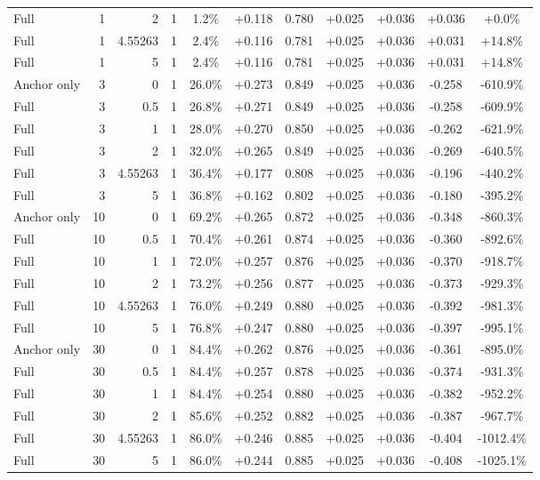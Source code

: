 \begin{table}[htbp]
\begin{tabular}{lrrrccccccc}
Full & 1 & 2 & 1 & 1.2\% & +0.118 & 0.780 & +0.025 & +0.036 & +0.036 & +0.0\% \\
Full & 1 & 4.55263 & 1 & 2.4\% & +0.116 & 0.781 & +0.025 & +0.036 & +0.031 & +14.8\% \\
Full & 1 & 5 & 1 & 2.4\% & +0.116 & 0.781 & +0.025 & +0.036 & +0.031 & +14.8\% \\
Anchor only & 3 & 0 & 1 & 26.0\% & +0.273 & 0.849 & +0.025 & +0.036 & -0.258 & -610.9\% \\
Full & 3 & 0.5 & 1 & 26.8\% & +0.271 & 0.849 & +0.025 & +0.036 & -0.258 & -609.9\% \\
Full & 3 & 1 & 1 & 28.0\% & +0.270 & 0.850 & +0.025 & +0.036 & -0.262 & -621.9\% \\
Full & 3 & 2 & 1 & 32.0\% & +0.265 & 0.849 & +0.025 & +0.036 & -0.269 & -640.5\% \\
Full & 3 & 4.55263 & 1 & 36.4\% & +0.177 & 0.808 & +0.025 & +0.036 & -0.196 & -440.2\% \\
Full & 3 & 5 & 1 & 36.8\% & +0.162 & 0.802 & +0.025 & +0.036 & -0.180 & -395.2\% \\
Anchor only & 10 & 0 & 1 & 69.2\% & +0.265 & 0.872 & +0.025 & +0.036 & -0.348 & -860.3\% \\
Full & 10 & 0.5 & 1 & 70.4\% & +0.261 & 0.874 & +0.025 & +0.036 & -0.360 & -892.6\% \\
Full & 10 & 1 & 1 & 72.0\% & +0.257 & 0.876 & +0.025 & +0.036 & -0.370 & -918.7\% \\
Full & 10 & 2 & 1 & 73.2\% & +0.256 & 0.877 & +0.025 & +0.036 & -0.373 & -929.3\% \\
Full & 10 & 4.55263 & 1 & 76.0\% & +0.249 & 0.880 & +0.025 & +0.036 & -0.392 & -981.3\% \\
Full & 10 & 5 & 1 & 76.8\% & +0.247 & 0.880 & +0.025 & +0.036 & -0.397 & -995.1\% \\
Anchor only & 30 & 0 & 1 & 84.4\% & +0.262 & 0.876 & +0.025 & +0.036 & -0.361 & -895.0\% \\
Full & 30 & 0.5 & 1 & 84.4\% & +0.257 & 0.878 & +0.025 & +0.036 & -0.374 & -931.3\% \\
Full & 30 & 1 & 1 & 84.4\% & +0.254 & 0.880 & +0.025 & +0.036 & -0.382 & -952.2\% \\
Full & 30 & 2 & 1 & 85.6\% & +0.252 & 0.882 & +0.025 & +0.036 & -0.387 & -967.7\% \\
Full & 30 & 4.55263 & 1 & 86.0\% & +0.246 & 0.885 & +0.025 & +0.036 & -0.404 & -1012.4\% \\
Full & 30 & 5 & 1 & 86.0\% & +0.244 & 0.885 & +0.025 & +0.036 & -0.408 & -1025.1\% \\

\end{tabular}
\end{table}
